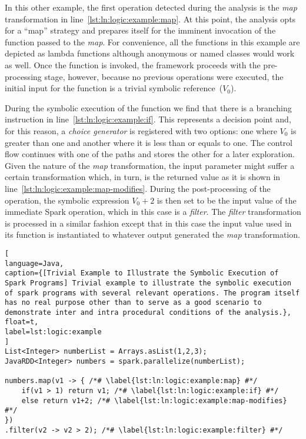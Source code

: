 In this other example, the first operation detected during the analysis is the \textit{map} transformation in line~\ref{lst:ln:logic:example:map}. At this point, the analysis opts for a ``map'' strategy and prepares itself for the imminent invocation of the function passed to the \textit{map}. For convenience, all the functions in this example are depicted as lambda functions although anonymous or named classes would work as well. Once the function is invoked, the framework proceeds with the pre-processing stage, however, because no previous operations were executed, the initial input for the function is a trivial symbolic reference~($V_0$).

During the symbolic execution of the function we find that there is a branching instruction in line~\ref{lst:ln:logic:example:if}. This represents a decision point and, for this reason, a \textit{choice generator} is registered with two options: one where $V_0$ is greater than one and another where it is less than or equals to one. The control flow continues with one of the paths and stores the other for a later exploration. Given the nature of the \textit{map} transformation, the input parameter might suffer a certain transformation which, in turn, is the returned value as it is shown in line~\ref{lst:ln:logic:example:map-modifies}. During the post-processing of the operation, the symbolic expression $V_0 + 2$ is then set to be the input value of the immediate Spark operation, which in this case is a \textit{filter}. The \textit{filter} transformation is processed in a similar fashion except that in this case the input value used in its function is instantiated to whatever output generated the \textit{map} transformation. 

\begin{lstlisting}[
language=Java,
caption={[Trivial Example to Illustrate the Symbolic Execution of Spark Programs] Trivial example to illustrate the symbolic execution of spark programs with several relevant operations. The program itself has no real purpose other than to serve as a good scenario to demonstrate inter and intra procedural conditions of the analysis.},
float=t,
label=lst:logic:example
]
List<Integer> numberList = Arrays.asList(1,2,3);
JavaRDD<Integer> numbers = spark.parallelize(numberList);

numbers.map(v1 -> { /*# \label{lst:ln:logic:example:map} #*/
	if(v1 > 1) return v1; /*# \label{lst:ln:logic:example:if} #*/
	else return v1+2; /*# \label{lst:ln:logic:example:map-modifies} #*/
})
.filter(v2 -> v2 > 2); /*# \label{lst:ln:logic:example:filter} #*/
\end{lstlisting}

